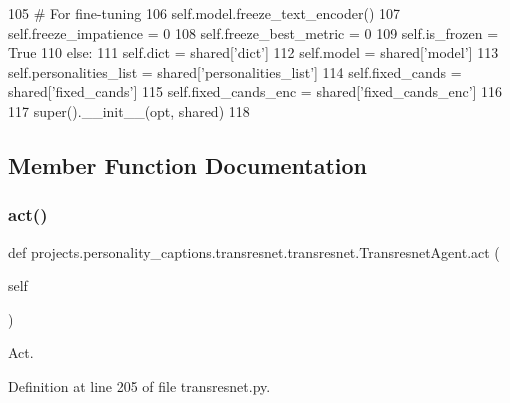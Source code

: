 \begin{DoxyCode}
105                 \textcolor{comment}{# For fine-tuning}
106                 self.model.freeze\_text\_encoder()
107                 self.freeze\_impatience = 0
108                 self.freeze\_best\_metric = 0
109                 self.is\_frozen = \textcolor{keyword}{True}
110         \textcolor{keywordflow}{else}:
111             self.dict = shared[\textcolor{stringliteral}{'dict'}]
112             self.model = shared[\textcolor{stringliteral}{'model'}]
113             self.personalities\_list = shared[\textcolor{stringliteral}{'personalities\_list'}]
114             self.fixed\_cands = shared[\textcolor{stringliteral}{'fixed\_cands'}]
115             self.fixed\_cands\_enc = shared[\textcolor{stringliteral}{'fixed\_cands\_enc'}]
116 
117         super().\_\_init\_\_(opt, shared)
118 
\end{DoxyCode}


\subsection{Member Function Documentation}
\mbox{\label{classprojects_1_1personality__captions_1_1transresnet_1_1transresnet_1_1TransresnetAgent_abba9eae98eb8f0bac353e2da64b98044}} 
\subsubsection{\texorpdfstring{act()}{act()}}
{\footnotesize\ttfamily def projects.\+personality\+\_\+captions.\+transresnet.\+transresnet.\+Transresnet\+Agent.\+act (\begin{DoxyParamCaption}\item[{}]{self }\end{DoxyParamCaption})}

\begin{DoxyVerb}Act.
\end{DoxyVerb}
 

Definition at line 205 of file transresnet.\+py.


